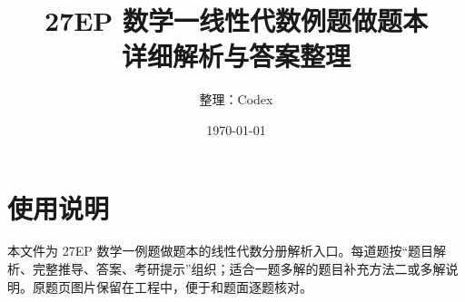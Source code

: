 \documentclass[UTF8,12pt,a4paper]{ctexbook}
\title{27EP 数学一线性代数例题做题本\\详细解析与答案整理}
\author{整理：Codex}
\date{\today}
\begin{document}
\maketitle
\tableofcontents

\chapter*{使用说明}
本文件为 27EP 数学一例题做题本的线性代数分册解析入口。每道题按“题目解析、完整推导、答案、考研提示”组织；适合一题多解的题目补充方法二或多解说明。原题页图片保留在工程中，便于和题面逐题核对。





\end{document}
